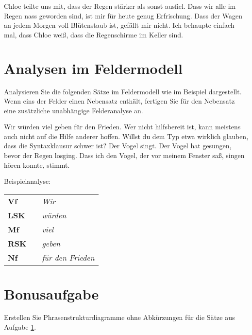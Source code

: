 \begin{exe}
\setcounter{xnumi}{0}
  \ex Chloe teilte uns mit, dass der Regen stärker als sonst ausfiel.
  \ex Dass wir alle im Regen nass geworden sind, ist mir für heute genug Erfrischung.
  \ex Dass der Wagen an jedem Morgen voll Blütenstaub ist, gefällt mir nicht.
  \ex Ich behaupte einfach mal, dass Chloe weiß, dass die Regenschirme im Keller sind.
\end{exe}

\section{Analysen im Feldermodell}\label{sec:felder}

Analysieren Sie die folgenden Sätze im Feldermodell wie im Beispiel dargestellt.
Wenn eins der Felder einen Nebensatz enthält, fertigen Sie für den Nebensatz eine zusätzliche unabhängige Felderanalyse an.

\begin{exe}
\setcounter{xnumi}{0}
  \ex Wir würden viel geben für den Frieden.
  \ex Wer nicht hilfsbereit ist, kann meistens auch nicht auf die Hilfe anderer hoffen.
  \ex Willst du dem Typ etwa wirklich glauben, dass die Syntaxklausur schwer ist?
  \ex Der Vogel singt.
  \ex Der Vogel hat gesungen, bevor der Regen losging.
  \ex Dass ich den Vogel, der vor meinem Fenster saß, singen hören konnte, stimmt.
\end{exe}

Beispielanalyse:

\Zeile

\begin{tabular}[h]{lp{1em}l}
  \textbf{Vf}  && \textit{Wir} \\
  \textbf{LSK} && \textit{würden} \\
  \textbf{Mf}  && \textit{viel} \\
  \textbf{RSK} && \textit{geben} \\
  \textbf{Nf}  && \textit{für den Frieden} \\
\end{tabular}

\section{Bonusaufgabe}

Erstellen Sie Phrasenstrukturdiagramme ohne Abkürzungen für die Sätze aus Aufgabe \ref{sec:felder}.

\newpage
\ \\
\newpage
\ \\
\newpage
\ \\

